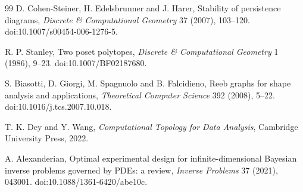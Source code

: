 \begin{thebibliography}{99}
D. Cohen-Steiner, H. Edelsbrunner and J. Harer,
Stability of persistence diagrams,
\emph{Discrete \& Computational Geometry} 37 (2007), 103--120.
doi:10.1007/s00454-006-1276-5.

R. P. Stanley,
Two poset polytopes,
\emph{Discrete \& Computational Geometry} 1 (1986), 9--23.
doi:10.1007/BF02187680.

S. Biasotti, D. Giorgi, M. Spagnuolo and B. Falcidieno,
Reeb graphs for shape analysis and applications,
\emph{Theoretical Computer Science} 392 (2008), 5--22.
doi:10.1016/j.tcs.2007.10.018.

T. K. Dey and Y. Wang,
\emph{Computational Topology for Data Analysis},
Cambridge University Press, 2022.

A. Alexanderian,
Optimal experimental design for infinite-dimensional Bayesian inverse problems governed by PDEs: a review,
\emph{Inverse Problems} 37 (2021), 043001.
doi:10.1088/1361-6420/abe10c.

\end{thebibliography}
